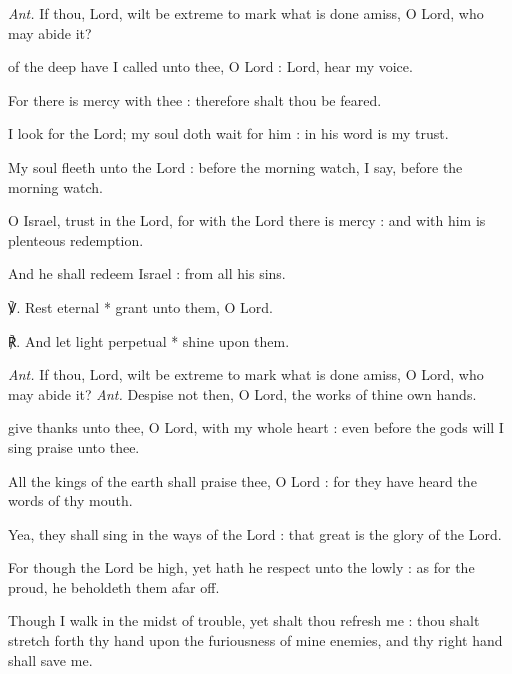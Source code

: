 \vspace{-1ex}
\noindent
\textit{Ant.} If thou, Lord, wilt be extreme {\dag} to mark what is done amiss, O Lord, who may abide it?\par
{} of the deep have I called unto thee, O Lord : Lord, hear my voice.\par
{}
For there is mercy with thee : therefore shalt thou be feared.\par
{}I look for the Lord; my soul doth wait for him : in his word is my trust.\par
{}My soul fleeth unto the Lord : before the morning watch, I say, before the morning watch.\par
{}O Israel, trust in the Lord, for with the Lord there is mercy : and with him is plenteous redemption.\par
{}And he shall redeem Israel : from all his sins.\par
℣. Rest eternal * grant unto them, O Lord.\par
℟. And let light perpetual * shine upon them.\par\noindent
\textit{Ant.} If thou, Lord, wilt be extreme to mark what is done amiss, O Lord, who may abide it?
\noindent
\textit{Ant.} Despise not then, {\dag} O Lord, the works of thine own hands.\par
{} give thanks unto thee, O Lord, with my whole heart : even before the gods will I sing praise unto thee.\par
{}
All the kings of the earth shall praise thee, O Lord : for they have heard the words of thy mouth.\par
{}Yea, they shall sing in the ways of the Lord : that great is the glory of the Lord.\par
{}For though the Lord be high, yet hath he respect unto the lowly : as for the proud, he beholdeth them afar off.\par
{}Though I walk in the midst of trouble, yet shalt thou refresh me : thou shalt stretch forth thy hand upon the furiousness of mine enemies, and thy right hand shall save me.\par
